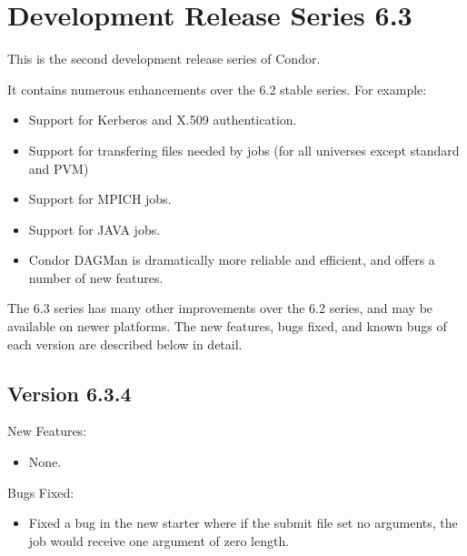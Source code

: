 \section{\label{sec:History-6-3}Development Release Series 6.3}

This is the second development release series of Condor.

It contains numerous enhancements over the 6.2 stable series.
For example:

\begin{itemize}

\item Support for Kerberos and X.509 authentication.

\item Support for transfering files needed by jobs (for all universes
except standard and PVM)

\item Support for MPICH jobs.

\item Support for JAVA jobs.

\item 
Condor DAGMan is dramatically more reliable and efficient, and offers
a number of new features.

\end{itemize}

The 6.3 series has many other improvements over the 6.2 series, and
may be available on newer platforms.  The new features, bugs fixed,
and known bugs of each version are described below in detail.


\subsection{\label{sec:New-6-3-4}Version 6.3.4}

\noindent New Features:

\begin{itemize}

\item None.

\end{itemize}

\noindent Bugs Fixed:

\begin{itemize}

\item Fixed a bug in the new starter where if the submit file set no
arguments, the job would receive one argument of zero length.

\end{itemize}

